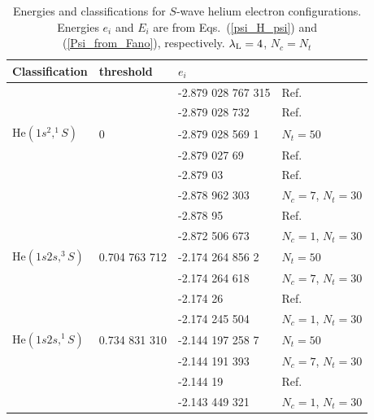 \documentclass[aip
, pra
, showpacs
, aps
, twocolumn
, groupedaddress
, floatfix
]{revtex4}
\begin{document}
\begin{table}[htb]
\caption{\label{Tab_ENGS}
Energies and classifications for $S$-wave helium electron configurations.
Energies $e_i$  and $E_i$ are from Eqs.~(\ref{psi_H_psi}) and (\ref{Psi_from_Fano}), respectively.
$\lambda_{\rm L}=4$, $N_c=N_t$
}
\begin{ruledtabular}
\begin{tabular}{llll}
Classification & threshold & $e_i$  &    \\
\hline
                      &    & -2.879 028 767 315 &  Ref. \cite{G94}    \\
                      &    & -2.879 028 732   &  Ref. \cite{JB97p2614}    \\
$\mbox{He}(1s^2,^1S)$ &  0 & -2.879 028 569 1 &  $N_t=50$   \\ %
                      &    & -2.879 027 69    &  Ref. \cite{DHIF94}    \\
                      &    & -2.879 03        &  Ref. \cite{HMR05R}    \\
                      &    & -2.878 962 303   &  $N_c=7$, $N_t=30$    \\
                      &    & -2.878 95        &  Ref. \cite{BS10p022715}    \\
                      &    & -2.872 506 673   &  $N_c=1$, $N_t=30$    \\
\hline
$\mbox{He}(1s2s,^3S)$    & 0.704 763 712  & -2.174 264 856 2 & $N_t=50$ \\  %
                         &                & -2.174 264 618   &  $N_c=7$, $N_t=30$    \\
                         &                & -2.174 26        &  Ref. \cite{BS10p022715}    \\
                         &                & -2.174 245 504   &  $N_c=1$, $N_t=30$    \\
\hline
$\mbox{He}(1s2s,^1S)$    & 0.734 831 310 & -2.144 197 258 7 &  $N_t=50$ \\
                         &               & -2.144 191 393   &  $N_c=7$, $N_t=30$    \\
                         &               & -2.144 19        &  Ref. \cite{BS10p022715}    \\
                         &               & -2.143 449 321   &  $N_c=1$, $N_t=30$    \\
\hline

\end{tabular}
\end{ruledtabular}
\end{table}
\end{document}
